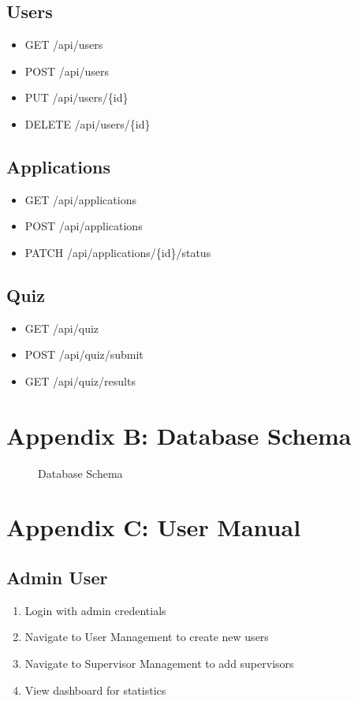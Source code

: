 \documentclass[12pt,a4paper]{report}
\begin{document}
\section{Users}
\begin{itemize}
    \item GET /api/users
    \item POST /api/users
    \item PUT /api/users/\{id\}
    \item DELETE /api/users/\{id\}
\end{itemize}

\section{Applications}
\begin{itemize}
    \item GET /api/applications
    \item POST /api/applications
    \item PATCH /api/applications/\{id\}/status
\end{itemize}

\section{Quiz}
\begin{itemize}
    \item GET /api/quiz
    \item POST /api/quiz/submit
    \item GET /api/quiz/results
\end{itemize}

\chapter{Appendix B: Database Schema}

\begin{figure}[H]
\caption{Database Schema}
\end{figure}

\chapter{Appendix C: User Manual}

\section{Admin User}
\begin{enumerate}
    \item Login with admin credentials
    \item Navigate to User Management to create new users
    \item Navigate to Supervisor Management to add supervisors
    \item View dashboard for statistics
\end{enumerate}
\end{document}
